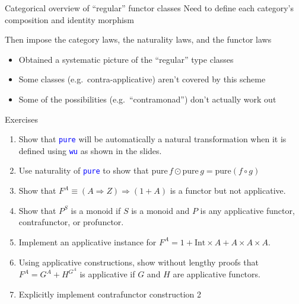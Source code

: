 \documentclass[english]{beamer}
\begin{document}
\begin{frame}{Categorical overview of ``regular'' functor classes}
Need to define each category's composition and identity morphism

Then impose the category laws, the naturality laws, and the functor
laws
\begin{itemize}
\item Obtained a systematic picture of the ``regular'' type classes
\item Some classes (e.g.\ contra-applicative) aren't covered by this scheme
\item Some of the possibilities (e.g.\ ``contramonad'') don't actually
work out
\end{itemize}
\end{frame}

\begin{frame}{Exercises}
\begin{enumerate}
\item {\footnotesize{}\vspace{-0.15cm}Show that }\texttt{\textcolor{blue}{\footnotesize{}pure}}{\footnotesize{}
will be automatically a natural transformation when it is defined
using }\texttt{\textcolor{blue}{\footnotesize{}wu}}{\footnotesize{}
as shown in the slides.}{\footnotesize \par}
\item {\footnotesize{}Use naturality of }\texttt{\textcolor{blue}{\footnotesize{}pure}}{\footnotesize{}
to show that $\text{pure}\,f\odot\text{pure}\,g=\text{pure}\left(f\circ g\right)$}{\footnotesize \par}
\item {\footnotesize{}Show that $F^{A}\equiv\left(A\Rightarrow Z\right)\Rightarrow\left(1+A\right)$
is a functor but not applicative.}{\footnotesize \par}
\item {\footnotesize{}Show that $P^{S}$ is a monoid if $S$ is a monoid
and $P$ is any applicative functor, contrafunctor, or profunctor.}{\footnotesize \par}
\item {\footnotesize{}Implement an applicative instance for $F^{A}=1+\text{Int}\times A+A\times A\times A$.}{\footnotesize \par}
\item {\footnotesize{}Using applicative constructions, show without lengthy
proofs that $F^{A}=G^{A}+H^{G^{A}}$ is applicative if $G$ and $H$
are applicative functors.}{\footnotesize \par}
\item {\footnotesize{}Explicitly implement contrafunctor construction 2
}
\end{enumerate}
\end{frame}
\end{document}
